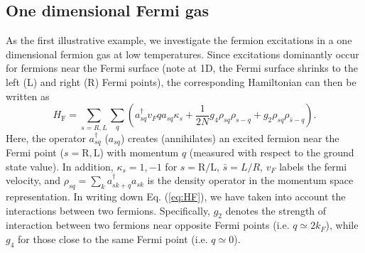 \documentclass[pra,epsfig,rotate,superscriptaddress,showpacs]{revtex4}
\begin{document}
\subsection{One dimensional Fermi gas}

As the first illustrative example, we investigate the fermion excitations in a one dimensional fermion gas at low temperatures. Since excitations dominantly occur for fermions near the Fermi surface (note at 1D, the Fermi surface shrinks to the left (L) and right (R) Fermi points), the corresponding Hamiltonian can then be written as~\cite{fergas}
\begin{equation}\label{eq:HF}
H_{\textrm{F}}=\sum_{s=R,L}\sum_{q}(a_{sq}^\dag v_F q a_{sq}\kappa_s +\frac{1}{2N} g_4\rho_{sq}\rho_{s-q}+g_2\rho_{sq}\rho_{\bar{s}-q}).
\end{equation}
Here, the operator $a_{sq}^\dag$ ($a_{sq}$) creates (annihilates) an excited fermion near the Fermi point ($s=\textrm{R}, \textrm{L}$) with momentum $q$ (measured with respect to the ground state value). In addition, $\kappa_s= 1,-1$ for $s=\textrm{R}/\textrm{L}$, $\bar{s}=L/R$, $v_F$ labels the fermi velocity, and $\rho_{sq}=\sum_k a_{sk+q}^\dag a_{sk}$ is the density operator in the momentum space representation. In writing down Eq. (\ref{eq:HF}), we have taken into account the interactions between two fermions. Specifically, $g_2$ denotes the strength of interaction between two fermions near opposite Fermi points (i.e. $q\simeq2k_F$), while $g_4$ for those close to the same Fermi point (i.e. $q\simeq0$).
\end{document}
